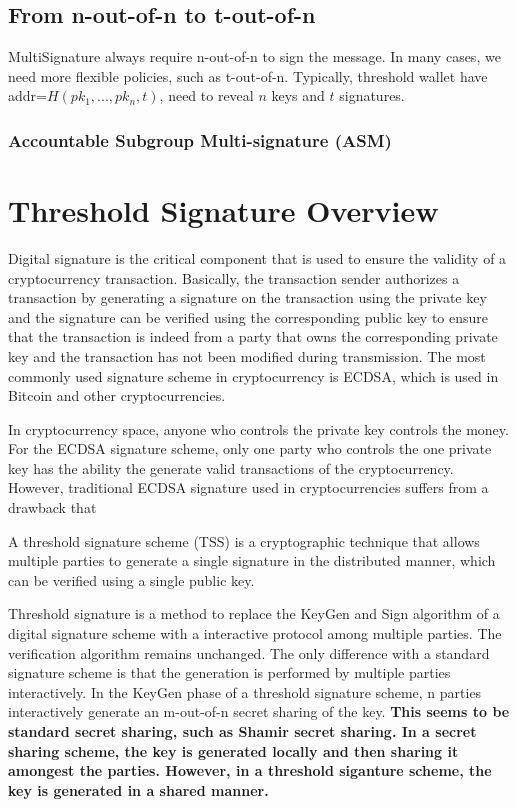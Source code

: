 \documentclass[12pt]{report}
\begin{document}
\subsection{From n-out-of-n to t-out-of-n}
MultiSignature always require n-out-of-n to sign the message. In many cases, we need more flexible policies, such as t-out-of-n. Typically, threshold wallet have addr=$H(pk_{1},...,pk_{n}, t)$, need to reveal $n$ keys and $t$ signatures.
\subsubsection{Accountable Subgroup Multi-signature (ASM)}


\section{Threshold Signature Overview}
Digital signature is the critical component that is used to ensure the validity of a cryptocurrency transaction. Basically, the transaction sender authorizes a transaction by generating a signature on the transaction using the private key and the signature can be verified using the corresponding public key to ensure that the transaction is indeed from a party that owns the corresponding private key and the transaction has not been modified during transmission. The most commonly used signature scheme in cryptocurrency is ECDSA, which is used in Bitcoin and other cryptocurrencies. 

In cryptocurrency space, anyone who controls the private key controls the money. For the ECDSA signature scheme, only one party who controls the one private key has the ability the generate valid transactions of the cryptocurrency.
However, traditional ECDSA signature used in cryptocurrencies suffers from a drawback that  

  
A threshold signature scheme (TSS) is a cryptographic technique that allows multiple parties to generate a single signature in the distributed manner, which can be verified using a single public key.



Threshold signature is a method to replace the KeyGen and Sign algorithm of a digital signature scheme with a interactive protocol among multiple parties. The verification algorithm remains unchanged. The only difference with a standard signature scheme is that the generation is performed by multiple parties interactively. In the KeyGen phase of a threshold signature scheme, n parties interactively generate an m-out-of-n secret sharing of the key. \textbf{This seems to be standard secret sharing, such as Shamir secret sharing. In a secret sharing scheme, the key is generated locally and then sharing it amongest the parties. However, in a threshold siganture scheme, the key is generated in a shared manner.}
\end{document}
